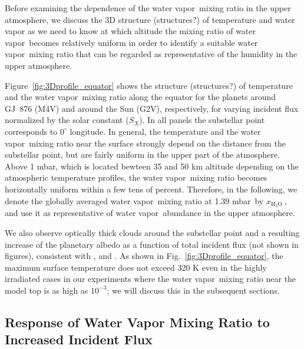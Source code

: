 \documentclass[11pt,numberedappendix,twocolappendix,]{emulateapj}
\def\water{H$_2$O }
\def\xwater{$x_\text{\water}$}
\def\preslevel{1.39 mbar\ }
\def\memo#1{\color{red}$[${\bf #1}$]$ \color{black}}
\newcommand{\yf}[1]{{\color{orange}#1}}
\newcommand{\wv}{water vapor\ }
\begin{document}
Before examining the dependence of the \wv mixing ratio in the upper atmosphere, we discuss the 3D \yf{structure (structures?)} of temperature and water vapor as we need to know at which altitude the mixing ratio of \wv becomes relatively uniform in order to identify a suitable \wv mixing ratio that can be regarded as representative of the humidity in the upper atmosphere. 

Figure~\ref{fig:3Dprofile_equator} shows the \yf{structure (structures?)} of temperature and the \wv mixing ratio along the equator for the planets around GJ~876 (M4V) and around the Sun (G2V), respectively, for varying incident flux normalized by the solar constant ($S_X$). 
In all panels the substellar point corresponds to $0^{\circ }$ longitude. 
In general, the temperature and the \wv mixing ratio near the surface strongly depend on the distance from the substellar point, but are fairly uniform in the upper part of the atmosphere. 
Above 1 mbar, which is located bewteen 35 and 50 km altitude depending on the atmospheric temperature profiles, the \wv mixing ratio becomes horizontally uniform within a few tens of percent. 
Therefore, in the following, we denote the globally averaged \wv mixing ratio at \preslevel by \xwater, and use it as representative of \wv abundance in the upper atmosphere. 

We also observe optically thick clouds around the substellar point and a resulting increase of the planetary albedo as a function of total incident flux (not shown in figures), consistent with \citet{Yang2013,Yang2014}, \citet{Kopparapu2016} and \citet{Way2016}. 
As shown in Fig.~\ref{fig:3Dprofile_equator}, the maximum surface temperature does not exceed 320 K even in the highly irradiated cases in our experiments where the \wv mixing ratio near the model top is as high as $10^{-3}$; we will discuss this in the subsequent sections. 


\subsection{Response of Water Vapor Mixing Ratio to Increased Incident Flux}
\label{ss:result_H2Omixingratio}
\end{document}
